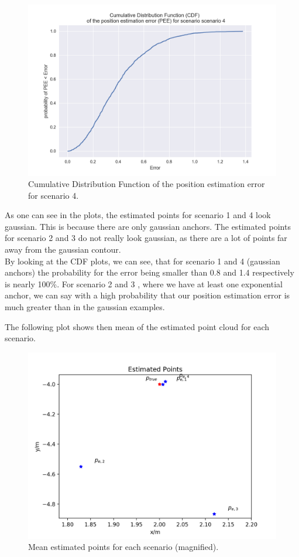 \begin{figure}[H]
	\centering
\includegraphics[width=14cm]{cdf4.png}
	\caption{Cumulative Distribution Function of the position estimation error for scenario 4.}
	\label{fig1:cdf4}
\end{figure}

As one can see in the plots, the estimated points for scenario 1 and 4 look gaussian. This is because there are only gaussian anchors. The estimated points for scenario 2 and 3 do not really look gaussian, as there are a lot of points far away from the gaussian contour.\\

By looking at the CDF plots, we can see, that for scenario 1 and 4 (gaussian anchors) the probability for the error being smaller than 0.8 and 1.4 respectively is nearly 100\%.
For scenario 2 and 3 , where we have at least one exponential anchor, we can say with a high probability that our position estimation error is much greater than in the gaussian examples.\newpage

The following plot shows then mean of the estimated point cloud for each scenario.

\begin{figure}[H]
	\centering
\includegraphics[width=14cm]{estimated_points.png}
	\caption{Mean estimated points for each scenario (magnified).}
	\label{fig1:meanpoints}
\end{figure}

